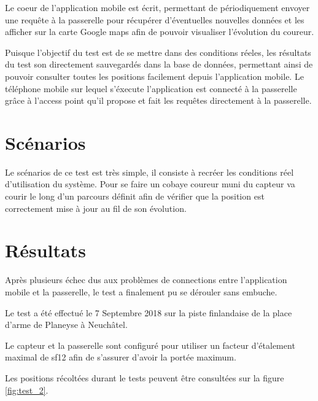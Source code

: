 Le coeur de l'application mobile est écrit, permettant de périodiquement envoyer une requête à la passerelle pour récupérer d'éventuelles nouvelles données et les afficher sur la carte Google maps afin de pouvoir visualiser l'évolution du coureur.

Puisque l'objectif du test est de se mettre dans des conditions réeles, les résultats du test son directement sauvegardés dans la base de données, permettant ainsi de pouvoir consulter toutes les positions facilement depuis l'application mobile. Le téléphone mobile sur lequel s'éxecute l'application est connecté à la passerelle grâce à l'access point qu'il propose et fait les requêtes directement à la passerelle.


\section{Scénarios}

Le scénarios de ce test est très simple, il consiste à recréer les conditions réel d'utilisation du système. Pour se faire un cobaye coureur muni du capteur va courir le long d'un parcours définit afin de vérifier que la position est correctement mise à jour au fil de son évolution.

\section{Résultats}

Après plusieurs échec dus aux problèmes de connections entre l'application mobile et la passerelle, le test a finalement pu se dérouler sans embuche.

Le test a été effectué le 7 Septembre 2018 sur la piste finlandaise de la place d'arme de Planeyse à Neuchâtel.

Le capteur et la passerelle sont configuré pour utiliser un facteur d'étalement maximal de sf12 afin de s'assurer d'avoir la portée maximum.

Les positions récoltées durant le tests peuvent être consultées sur la figure \ref{fig:test_2}.

